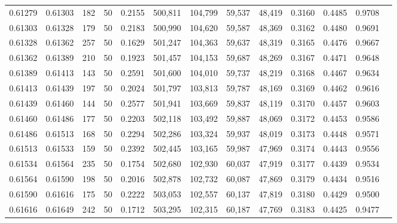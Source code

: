 \begin{tabular}{rrrrrrrrrrrrr}
0.61279 & 0.61303 &   182 &  50 &                                     0.2155 & 500,811 & 104,799 &  59,537 &  48,419 & 0.3160 & 0.4485 & 0.9708 \\
0.61303 & 0.61328 &   179 &  50 &                                     0.2183 & 500,990 & 104,620 &  59,587 &  48,369 & 0.3162 & 0.4480 & 0.9691 \\
0.61328 & 0.61362 &   257 &  50 &                                     0.1629 & 501,247 & 104,363 &  59,637 &  48,319 & 0.3165 & 0.4476 & 0.9667 \\
0.61362 & 0.61389 &   210 &  50 &                                     0.1923 & 501,457 & 104,153 &  59,687 &  48,269 & 0.3167 & 0.4471 & 0.9648 \\
0.61389 & 0.61413 &   143 &  50 &                                     0.2591 & 501,600 & 104,010 &  59,737 &  48,219 & 0.3168 & 0.4467 & 0.9634 \\
0.61413 & 0.61439 &   197 &  50 &                                     0.2024 & 501,797 & 103,813 &  59,787 &  48,169 & 0.3169 & 0.4462 & 0.9616 \\
0.61439 & 0.61460 &   144 &  50 &                                     0.2577 & 501,941 & 103,669 &  59,837 &  48,119 & 0.3170 & 0.4457 & 0.9603 \\
0.61460 & 0.61486 &   177 &  50 &                                     0.2203 & 502,118 & 103,492 &  59,887 &  48,069 & 0.3172 & 0.4453 & 0.9586 \\
0.61486 & 0.61513 &   168 &  50 &                                     0.2294 & 502,286 & 103,324 &  59,937 &  48,019 & 0.3173 & 0.4448 & 0.9571 \\
0.61513 & 0.61533 &   159 &  50 &                                     0.2392 & 502,445 & 103,165 &  59,987 &  47,969 & 0.3174 & 0.4443 & 0.9556 \\
0.61534 & 0.61564 &   235 &  50 &                                     0.1754 & 502,680 & 102,930 &  60,037 &  47,919 & 0.3177 & 0.4439 & 0.9534 \\
0.61564 & 0.61590 &   198 &  50 &                                     0.2016 & 502,878 & 102,732 &  60,087 &  47,869 & 0.3179 & 0.4434 & 0.9516 \\
0.61590 & 0.61616 &   175 &  50 &                                     0.2222 & 503,053 & 102,557 &  60,137 &  47,819 & 0.3180 & 0.4429 & 0.9500 \\
0.61616 & 0.61649 &   242 &  50 &                                     0.1712 & 503,295 & 102,315 &  60,187 &  47,769 & 0.3183 & 0.4425 & 0.9477 \\

\end{tabular}
